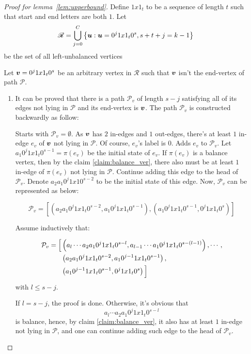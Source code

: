 \begin{proof}[Proof for lemma~\ref{lem:upperbound}]
    Define $1x1_{t}$ to be a sequence of length $t$ such that start and end letters are both $1$. Let $$\mathscr{R}=\bigcup_{j=0}^{C}\left\{{\boldsymbol u}:{\boldsymbol u}=0^{j}1x1_{t}0^{s},s+t+j=k-1\right\}$$ be the set of all left-unbalanced vertices
    
    Let ${\boldsymbol v}=0^{j}1x1_{t}0^{s}$ be an arbitrary vertex in $\mathscr{R}$ such that ${\boldsymbol v}$ isn't the end-vertex of path $\mathscr{P}$. 
    
    \begin{enumerate}
        \item It can be proved that there is a path $\mathcal{P}_{v}$ of length $s-j$ satisfying all of its edges not lying in $\mathscr{P}$ and its end-vertex is ${\boldsymbol v}$.
            The path $\mathcal{P}_{v}$ is constructed backwardly as follow:
            
            Starts with $\mathcal{P}_{v}=\emptyset$. As ${\boldsymbol v}$ has $2$ in-edges and $1$ out-edges, there's at least $1$ in-edge $e_{v}$ of ${\boldsymbol v}$ not lying in $\mathscr{P}$. Of course, $e_{v}$'s label is $0$. Adds $e_{v}$ to $\mathscr{P}_{v}$. Let $a_{1}0^{j}1x1_{t}0^{s-1}= \pi(e_{v})$ be the initial state of $e_{v}$. If $\pi(e_{v})$ is a balance vertex, then by the claim \ref{claim:balance_ver}, there also must be at least $1$ in-edge of $\pi(e_{v})$ not lying in $\mathscr{P}$. Continue adding this edge to the head of $\mathcal{P}_{v}$. Denote $a_{2}a_{1}0^{j}1x10^{s-2}$ to be the initial state of this edge. Now, $\mathcal{P}_{v}$ can be represented as below:
            
            \[\mathcal{P}_{v}=[\left(a_{2}a_{1}0^{j}1x1_{t}0^{s-2},a_{1}0^{j}1x1_{t}0^{s-1}\right), \left(a_{1}0^{j}1x1_{t}0^{s-1},0^{j}1x1_{t}0^{s}\right)]\]
            
            Assume inductively that:
            
            \begin{align*}
                \mathcal{P}_{v}= \Bigl[&\left(a_{l}\cdots a_{2}a_{1}0^{j}1x1_{t}0^{s-l},a_{l-1}\cdots a_{1}0^{j}1x1_{t}0^{s-(l-1)}\right),\cdots,\\
                &\left(a_{2}a_{1}0^{j}1x1_{t}0^{s-2}, a_{1}0^{j-1}1x1_{t}0^{s-1}\right),\\
                &\left(a_{1}0^{j-1}1x1_{t}0^{s-1},0^{j}1x1_{t}0^{s}\right)\Bigl]   
            \end{align*}
            with $l\leq s-j$.
            
            If $l=s-j$, the proof is done. Otherwise, it's obvious that $$a_{l}\cdots a_{2}a_{1}0^{j}1x1_{t}0^{s-l}$$ is balance, hence, by claim \ref{claim:balance_ver}, it also has at least $1$ in-edge not lying in $\mathscr{P}$, and one can continue adding such edge to the head of $\mathcal{P}_{v}$.
            

\end{enumerate}
\end{proof}
